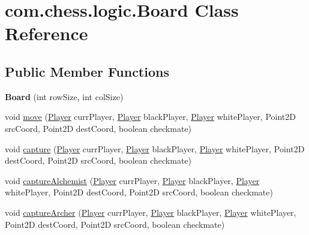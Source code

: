 \hypertarget{classcom_1_1chess_1_1logic_1_1_board}{}\section{com.\+chess.\+logic.\+Board Class Reference}
\label{classcom_1_1chess_1_1logic_1_1_board}
\subsection*{Public Member Functions}
\begin{DoxyCompactItemize}
\item 
\mbox{\label{classcom_1_1chess_1_1logic_1_1_board_afb3986c175fd77c4116262aeb6c297cd}} 
{\bfseries Board} (int row\+Size, int col\+Size)
\item 
void \mbox{\hyperlink{classcom_1_1chess_1_1logic_1_1_board_a343168b644f54fc8b82a49e90175f315}{move}} (\mbox{\hyperlink{classcom_1_1chess_1_1logic_1_1_player}{Player}} curr\+Player, \mbox{\hyperlink{classcom_1_1chess_1_1logic_1_1_player}{Player}} black\+Player, \mbox{\hyperlink{classcom_1_1chess_1_1logic_1_1_player}{Player}} white\+Player, Point2D src\+Coord, Point2D dest\+Coord, boolean checkmate)
\item 
void \mbox{\hyperlink{classcom_1_1chess_1_1logic_1_1_board_ac87500f02f308a9068927e127ea253c0}{capture}} (\mbox{\hyperlink{classcom_1_1chess_1_1logic_1_1_player}{Player}} curr\+Player, \mbox{\hyperlink{classcom_1_1chess_1_1logic_1_1_player}{Player}} black\+Player, \mbox{\hyperlink{classcom_1_1chess_1_1logic_1_1_player}{Player}} white\+Player, Point2D dest\+Coord, Point2D src\+Coord, boolean checkmate)
\item 
void \mbox{\hyperlink{classcom_1_1chess_1_1logic_1_1_board_aa8a12b0ffa00f9add4fd532c52504407}{capture\+Alchemist}} (\mbox{\hyperlink{classcom_1_1chess_1_1logic_1_1_player}{Player}} curr\+Player, \mbox{\hyperlink{classcom_1_1chess_1_1logic_1_1_player}{Player}} black\+Player, \mbox{\hyperlink{classcom_1_1chess_1_1logic_1_1_player}{Player}} white\+Player, Point2D dest\+Coord, Point2D src\+Coord, boolean checkmate)
\item 
void \mbox{\hyperlink{classcom_1_1chess_1_1logic_1_1_board_acff95978992c19ce0face4179c808af3}{capture\+Archer}} (\mbox{\hyperlink{classcom_1_1chess_1_1logic_1_1_player}{Player}} curr\+Player, \mbox{\hyperlink{classcom_1_1chess_1_1logic_1_1_player}{Player}} black\+Player, \mbox{\hyperlink{classcom_1_1chess_1_1logic_1_1_player}{Player}} white\+Player, Point2D dest\+Coord, Point2D src\+Coord, boolean checkmate)

\end{DoxyCompactItemize}
